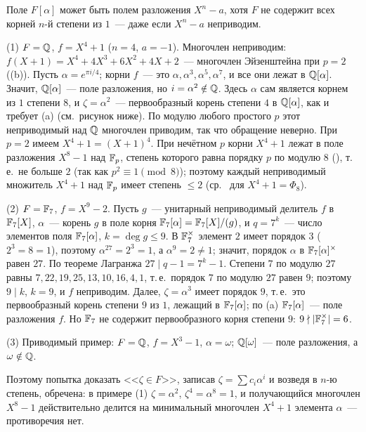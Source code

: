 \begin{example}[2.10a]
Поле $F[\alpha]$ может быть полем разложения $X^n-a$, хотя $F$ не содержит всех корней $n$-й степени из $1$~--- даже если
$X^n-a$ неприводим.

(1) $F=\mathbb Q$, $f=X^4+1$ ($n=4$, $a=-1$). Многочлен неприводим: $f(X+1)=X^4+4X^3+6X^2+4X+2$~--- многочлен Эйзенштейна при $p=2$
((b)).
Пусть $\alpha=e^{\pi i/4}$; корни $f$~--- это $\alpha,\alpha^3,\alpha^5,\alpha^7$, и все они лежат в $\mathbb Q[\alpha]$. Значит,
$\mathbb Q[\alpha]$~--- поле разложения, но $i=\alpha^2\notin\mathbb Q$. Здесь $\alpha$ сам является корнем из $1$ степени $8$, и
$\zeta=\alpha^2$~--- первообразный корень степени $4$ в $\mathbb Q[\alpha]$, как и требует (a) (см.\ рисунок ниже).
По модулю любого простого $p$ этот неприводимый над $\mathbb Q$ многочлен приводим, так что обращение  неверно. При
$p=2$ имеем $X^4+1=(X+1)^4$. При нечётном $p$ корни $X^4+1$ лежат в поле разложения $X^8-1$ над $\mathbb F_p$, степень
которого равна порядку $p$ по модулю $8$ (), т.\,е.\ не больше $2$ (так как $p^2\equiv1\pmod8$); поэтому каждый
неприводимый множитель $X^4+1$ над $\mathbb F_p$ имеет степень $\le2$ (ср.\  для $X^4+1=\Phi_8$).

(2) $F=\mathbb F_7$, $f=X^9-2$. Пусть $g$~--- унитарный неприводимый делитель $f$ в $\mathbb F_7[X]$, $\alpha$~--- корень $g$ в поле
корня $\mathbb F_7[\alpha]=\mathbb F_7[X]/(g)$, и $q=7^k$~--- число элементов поля $\mathbb F_7[\alpha]$, $k=\deg g\le9$. В $\mathbb F_7^\times$ элемент $2$ имеет порядок $3$ ($2^3=8=1$),
поэтому $\alpha^{27}=2^3=1$, а $\alpha^9=2\ne1$; значит, порядок $\alpha$ в $\mathbb F_7[\alpha]^\times$ равен $27$. По теореме Лагранжа
$27\mid q-1=7^k-1$. Степени $7$ по модулю $27$ равны $7,22,19,25,13,10,16,4,1$, т.\,е.\ порядок $7$ по модулю $27$ равен
$9$; поэтому $9\mid k$, $k=9$, и $f$ неприводим. Далее, $\zeta=\alpha^3$ имеет порядок $9$, т.\,е.\ это первообразный корень
степени $9$ из $1$, лежащий в $\mathbb F_7[\alpha]$; по (a) $\mathbb F_7[\alpha]$~--- поле разложения $f$. Но $\mathbb F_7$ не содержит
первообразного корня степени $9$: $9\nmid|\mathbb F_7^\times|=6$.

(3) Приводимый пример: $F=\mathbb Q$, $f=X^3-1$, $\alpha=\omega$; $\mathbb Q[\omega]$~--- поле разложения, а $\omega\notin\mathbb Q$.

Поэтому попытка доказать <<$\zeta\in F$>>, записав $\zeta=\sum c_i\alpha^i$ и возведя в $n$-ю степень, обречена: в примере (1)
$\zeta=\alpha^2$, $\zeta^4=\alpha^8=1$, и получающийся многочлен $X^8-1$ действительно делится на минимальный многочлен
$X^4+1$ элемента $\alpha$~--- противоречия нет.
\end{example}

